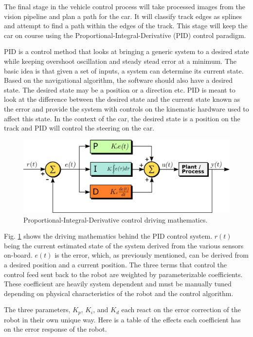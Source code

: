 \documentclass{article}
\begin{document}
The final stage in the vehicle control process will take processed images from the
vision pipeline and plan a path for the car. It will classify track edges as splines
and attempt to find a path within the edges of the track. This stage will keep the car
on course using the Proportional-Integral-Derivative (PID) control paradigm.

PID is a control method that looks at bringing a generic system to a desired state
while keeping overshoot oscillation and steady stead error at a minimum. The basic 
idea is that given a set of inputs, a system can determine its current state. Based
on the navigational algorithm, the software should also have a desired state. The
desired state may be a position or a direction etc. PID is meant to look at the
difference between the desired state and the current state known as the error
and provide the system with controls on the kinematic hardware used to affect this
state. In the context of the car, the desired state is a position on the track
and PID will control the steering on the car.

\begin{figure}[htb]
	\centering
	\centerline{\includegraphics[width=1.0\linewidth]{pid}}
	\caption{Proportional-Integral-Derivative control driving mathematics.}
	\label{fig:pid}
\end{figure}

Fig. \ref{fig:pid} shows the driving mathematics behind the PID control system.
$r(t)$ being the current estimated state of the system derived from the various
sensors on-board. $e(t)$ is the error, which, as previously mentioned, can be
derived from a desired position and a current position. The three terms that
control the control feed sent back to the robot are weighted by parameterizable
coefficients. These coefficient are heavily system dependent and must be manually
tuned depending on physical characteristics of the robot and the control algorithm.

The three parameters, $K_p$, $K_i$, and $K_d$ each react on the error correction
of the robot in their own unique way. Here is a table of the effects each
coefficient has on the error response of the robot.
\end{document}
